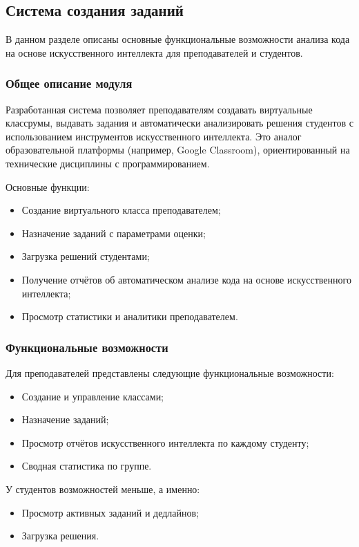 \subsection{Система создания заданий}

В данном разделе описаны основные функциональные возможности анализа кода на основе искусственного интеллекта для преподавателей и студентов.

\subsubsection{Общее описание модуля}
Разработанная система позволяет преподавателям создавать виртуальные классрумы, выдавать задания и автоматически анализировать решения студентов с использованием инструментов искусственного интеллекта. Это аналог образовательной платформы (например, Google Classroom), ориентированный на технические дисциплины с программированием.

Основные функции:
\begin{itemize}
  \item Создание виртуального класса преподавателем;
  \item Назначение заданий с параметрами оценки;
  \item Загрузка решений студентами;
  \item Получение отчётов об автоматическом анализе кода на основе искусственного интеллекта;
  \item Просмотр статистики и аналитики преподавателем.
\end{itemize}

\subsubsection{Функциональные возможности}

Для преподавателей представлены следующие функциональные возможности: 

\begin{itemize}
  \item Создание и управление классами;
  \item Назначение заданий;
  \item Просмотр отчётов искусственного интеллекта по каждому студенту;
  \item Сводная статистика по группе.
\end{itemize}

У студентов возможностей меньше, а именно:

\begin{itemize}
  \item Просмотр активных заданий и дедлайнов;
  \item Загрузка решения.
\end{itemize}

